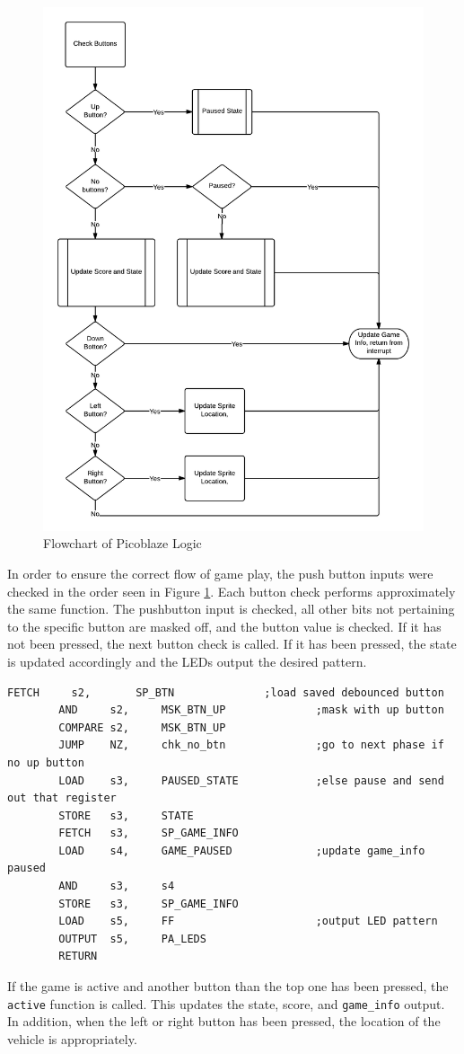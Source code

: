 \documentclass[11pt]{article}
\begin{document}
		\begin{figure}[h!]\centering
		  \includegraphics[width=.8\textwidth]{Images/game_logic.png}
		  \caption{Flowchart of Picoblaze Logic}
		  \label{game_logic}
		\end{figure}	


In order to ensure the correct flow of game play, the push button inputs were checked in the order seen in Figure \ref{game_logic}.  Each button check performs approximately the same function.  The pushbutton input is checked, all other bits not pertaining to the specific button are masked off, and the button value is checked.  If it has not been pressed, the next button check is called.  If it has been pressed, the state is updated accordingly and the LEDs output the desired pattern. 
\vspace{12pt}
\begin{lstlisting}[caption=Function checking if the top button has been pushed, label=chk_up_btn]		
		FETCH	  s2,		SP_BTN				;load saved debounced button
		AND		s2,		MSK_BTN_UP				;mask with up button
		COMPARE s2,		MSK_BTN_UP
		JUMP 	NZ, 	chk_no_btn				;go to next phase if no up button
		LOAD 	s3,		PAUSED_STATE			;else pause and send out that register
		STORE	s3,		STATE
		FETCH	s3,		SP_GAME_INFO
		LOAD 	s4,	    GAME_PAUSED        		;update game_info paused	
		AND		s3,		s4						
		STORE	s3,		SP_GAME_INFO
		LOAD	s5,		FF						;output LED pattern
		OUTPUT	s5,		PA_LEDS
		RETURN	
 \end{lstlisting}
\vspace{12pt}
\hspace{16pt}If the game is active and another button than the top one has been pressed, the \texttt{active} function is called.  This updates the state, score, and \texttt{game\_info} output.  In addition, when the left or right button has been pressed, the location of the vehicle is appropriately.\\
\end{document}
